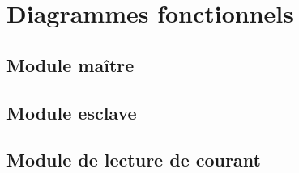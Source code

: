 \section{Diagrammes fonctionnels}
	\paragraph*{}
	\subsection{Module maître}
		\paragraph*{}
	\subsection{Module esclave}
		\paragraph*{}
	\subsection{Module de lecture de courant}
		\paragraph*{}
